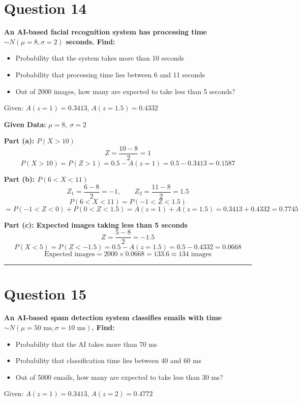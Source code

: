 \documentclass[12pt,a4paper]{article}
\begin{document}
\section{Question 14}
\textbf{An AI-based facial recognition system has processing time $\sim N(\mu=8, \sigma=2)$ seconds. Find:}
\begin{itemize}[noitemsep]
\item[(a)] Probability that the system takes more than 10 seconds
\item[(b)] Probability that processing time lies between 6 and 11 seconds
\item[(c)] Out of 2000 images, how many are expected to take less than 5 seconds?
\end{itemize}
Given: $A(z=1) = 0.3413$, $A(z=1.5) = 0.4332$

\textbf{Given Data:} $\mu = 8,\ \sigma = 2$

\textbf{Part (a): $P(X > 10)$}
\[
Z = \frac{10-8}{2} = 1
\]
\[
P(X > 10) = P(Z > 1) = 0.5 - A(z=1) = 0.5 - 0.3413 = \boxed{0.1587}
\]

\textbf{Part (b): $P(6 < X < 11)$}
\[
Z_1 = \frac{6-8}{2} = -1, \qquad Z_2 = \frac{11-8}{2} = 1.5
\]
\[
P(6 < X < 11) = P(-1 < Z < 1.5)
\]
\[
= P(-1 < Z < 0) + P(0 < Z < 1.5) = A(z=1) + A(z=1.5) = 0.3413 + 0.4332 = \boxed{0.7745}
\]

\textbf{Part (c): Expected images taking less than 5 seconds}
\[
Z = \frac{5-8}{2} = -1.5
\]
\[
P(X < 5) = P(Z < -1.5) = 0.5 - A(z=1.5) = 0.5 - 0.4332 = 0.0668
\]
\[
\text{Expected images} = 2000 \times 0.0668 = 133.6 \approx \boxed{134 \text{ images}}
\]

\vspace{1em}\hrule\vspace{1em}

\section{Question 15}
\textbf{An AI-based spam detection system classifies emails with time $\sim N(\mu=50\text{ ms}, \sigma=10\text{ ms})$. Find:}
\begin{itemize}[noitemsep]
\item[(a)] Probability that the AI takes more than 70 ms
\item[(b)] Probability that classification time lies between 40 and 60 ms
\item[(c)] Out of 5000 emails, how many are expected to take less than 30 ms?
\end{itemize}
Given: $A(z=1) = 0.3413$, $A(z=2) = 0.4772$
\end{document}
